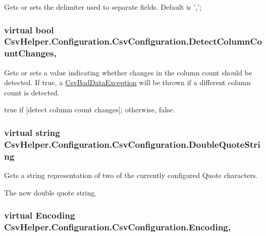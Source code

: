 Gets or sets the delimiter used to separate fields. Default is ','; 

\hypertarget{a00043_a615120d2e42818bc37d87181b72d4ad3}{
\subsubsection[{Detect\-Column\-Count\-Changes}]{\setlength{\rightskip}{0pt plus 5cm}virtual bool Csv\-Helper.\-Configuration.\-Csv\-Configuration.\-Detect\-Column\-Count\-Changes\hspace{0.3cm}{\ttfamily [get]}, {\ttfamily [set]}}}\label{a00043_a615120d2e42818bc37d87181b72d4ad3}


Gets or sets a value indicating whether changes in the column count should be detected. If true, a \hyperlink{a00039}{Csv\-Bad\-Data\-Exception} will be thrown if a different column count is detected. 

{\ttfamily true} if \mbox{[}detect column count changes\mbox{]}; otherwise, {\ttfamily false}. \hypertarget{a00043_a5f5825f9343c21ef968486cef817e11d}{
\subsubsection[{Double\-Quote\-String}]{\setlength{\rightskip}{0pt plus 5cm}virtual string Csv\-Helper.\-Configuration.\-Csv\-Configuration.\-Double\-Quote\-String\hspace{0.3cm}{\ttfamily [get]}}}\label{a00043_a5f5825f9343c21ef968486cef817e11d}


Gets a string representation of two of the currently configured Quote characters. 

The new double quote string. \hypertarget{a00043_a28a7819a63acdc5982093ce3b84102d8}{
\subsubsection[{Encoding}]{\setlength{\rightskip}{0pt plus 5cm}virtual Encoding Csv\-Helper.\-Configuration.\-Csv\-Configuration.\-Encoding\hspace{0.3cm}{\ttfamily [get]}, {\ttfamily [set]}}}\label{a00043_a28a7819a63acdc5982093ce3b84102d8}


